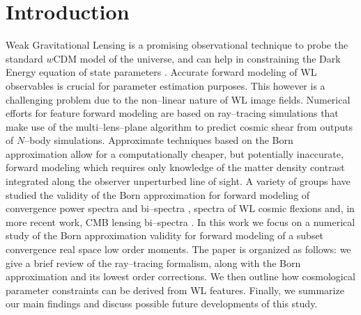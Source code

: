 \documentclass[reprint,aps,prd,superscriptaddress,showkeys,showpacs]{revtex4-1}
\begin{document}
\maketitle



\section{Introduction}
%
Weak Gravitational Lensing is a promising observational technique to probe the standard $w$CDM model of the universe, and can help in constraining the Dark Energy equation of state parameters \citep{wlreview}. Accurate forward modeling of WL observables is crucial for parameter estimation purposes. This however is a challenging problem due to the non--linear nature of WL image fields. Numerical efforts for feature forward modeling are based on ray--tracing simulations that make use of the multi--lens--plane algorithm \citep{RayTracingJain,RayTracingHartlap} to predict cosmic shear from outputs of $N$--body simulations. Approximate techniques based on the Born approximation allow for a computationally cheaper, but potentially inaccurate, forward modeling \citep{RayTracingHartlap} which requires only knowledge of the matter density contrast integrated along the observer unperturbed line of sight. A variety of groups have studied the validity of the Born approximation for forward modeling of convergence power spectra and bi--spectra \citep{WLBispectrumDodelson}, spectra of WL cosmic flexions \citep{BornFlexion} and, in more recent work, CMB lensing bi--spectra \citep{CMBPrattenLewis}. In this work we focus on a numerical study of the Born approximation validity for forward modeling of a subset convergence real space low order moments. The paper is organized as follows: we give a brief review of the ray--tracing formalism, along with the Born approximation and its lowest order corrections. We then outline how cosmological parameter constraints can be derived from WL features. Finally, we summarize our main findings and discuss possible future developments of this study.       

\end{document}
